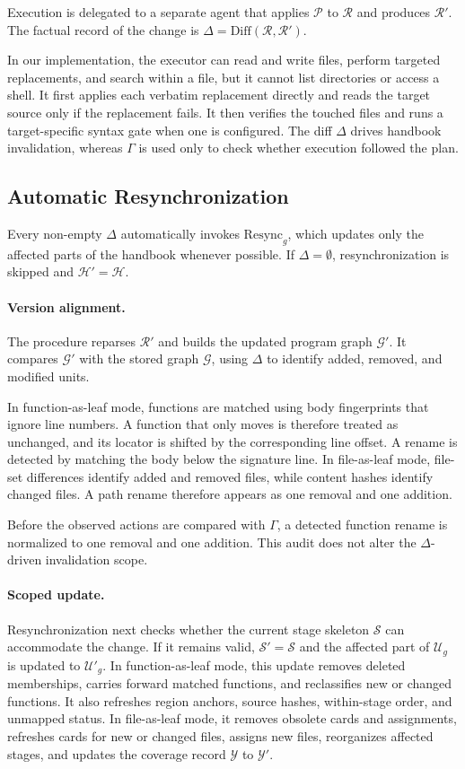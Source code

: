 \documentclass[]{ailab}
\newcommand{\hbsmall}{\textsf{function-as-leaf}}
\newcommand{\hblarge}{\textsf{file-as-leaf}}
\begin{document}
Execution is delegated to a separate agent that applies $\mathcal{P}$ to
$\mathcal{R}$ and produces $\mathcal{R}'$. The factual record of the change is
$\Delta=\mathrm{Diff}(\mathcal{R},\mathcal{R}')$.

In our implementation, the executor can read and write files, perform targeted
replacements, and search within a file, but it cannot list directories or access
a shell. It first applies each verbatim replacement directly and reads the target
source only if the replacement fails. It then verifies the touched files and runs
a target-specific syntax gate when one is configured. The diff $\Delta$ drives
handbook invalidation, whereas $\Gamma$ is used only to check whether execution
followed the plan.

\subsection{Automatic Resynchronization}

Every non-empty $\Delta$ automatically invokes $\mathrm{Resync}_g$, which updates
only the affected parts of the handbook whenever possible. If
$\Delta=\emptyset$, resynchronization is skipped and $\mathcal{H}'=\mathcal{H}$.

\paragraph{Version alignment.}
The procedure reparses $\mathcal{R}'$ and builds the updated program graph
$\mathcal{G}'$. It compares $\mathcal{G}'$ with the stored graph $\mathcal{G}$,
using $\Delta$ to identify added, removed, and modified units.

In \hbsmall{} mode, functions are matched using body fingerprints that ignore
line numbers. A function that only moves is therefore treated as unchanged, and
its locator is shifted by the corresponding line offset. A rename is detected by
matching the body below the signature line. In \hblarge{} mode, file-set
differences identify added and removed files, while content hashes identify
changed files. A path rename therefore appears as one removal and one addition.

Before the observed actions are compared with $\Gamma$, a detected function
rename is normalized to one removal and one addition. This audit does not alter
the $\Delta$-driven invalidation scope.

\paragraph{Scoped update.}
Resynchronization next checks whether the current stage skeleton $\mathcal{S}$
can accommodate the change. If it remains valid, $\mathcal{S}'=\mathcal{S}$ and
the affected part of $\mathcal{U}_g$ is updated to $\mathcal{U}'_g$. In
\hbsmall{} mode, this update removes deleted memberships, carries forward
matched functions, and reclassifies new or changed functions. It also refreshes
region anchors, source hashes, within-stage order, and unmapped status. In
\hblarge{} mode, it removes obsolete cards and assignments, refreshes cards for
new or changed files, assigns new files, reorganizes affected stages, and updates
the coverage record $\mathcal{Y}$ to $\mathcal{Y}'$.
\end{document}
